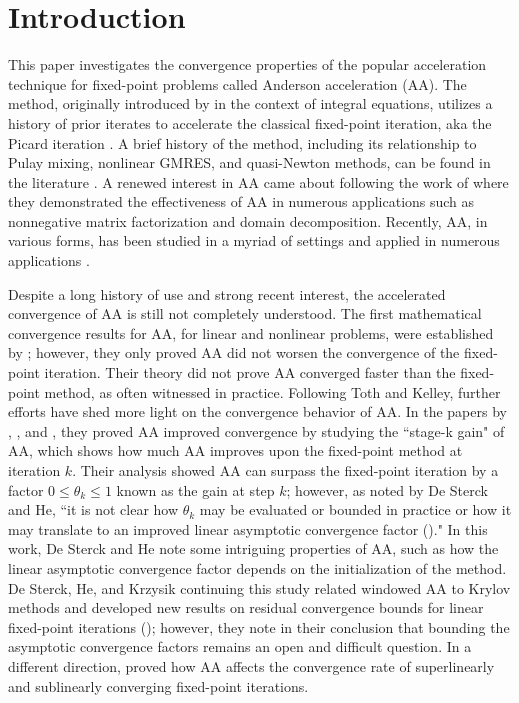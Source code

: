 \documentclass[11pt]{article}
\begin{document}
\section{Introduction}\label{sec:intro}
This paper investigates the convergence properties of the popular acceleration technique for fixed-point problems called Anderson acceleration (AA). The method, originally introduced by \cite{anderson1965} in the context of integral equations, utilizes a history of prior iterates to accelerate the classical fixed-point iteration, aka the Picard iteration \citep{picard1890memoire}. 
A brief history of the method, including its relationship to Pulay mixing, nonlinear GMRES, and quasi-Newton methods, can be found in the literature \citep{fang2009two,kelley2018numerical,potra2013characterization,pulay1980convergence}.
A renewed interest in AA came about following the work of \cite{walker2011anderson} where they demonstrated the effectiveness of AA in numerous applications such as nonnegative matrix factorization and domain decomposition. 
Recently, AA, in various forms, has been studied in a myriad of settings and applied in numerous applications \citep{geist2018anderson,shi2019regularized,sun2021damped,zhang2020globally,brezinski2022shanks,bian2021anderson,bian2022anderson}. 

Despite a long history of use and strong recent interest, the accelerated convergence of AA is still not completely understood. 
The first mathematical convergence results for AA, for linear and nonlinear problems, were established by \cite{Toth2015}; however, they only proved AA did not worsen the convergence of the fixed-point iteration. Their theory did
not prove AA converged faster than the fixed-point method, as often witnessed in practice. Following Toth and Kelley, further efforts have shed more light on the convergence behavior of AA. In the papers by \cite{Evans2020}, \cite{pollock2019anderson}, and \cite{pollock2021anderson}, they proved AA improved convergence by studying the ``stage-k gain" of AA, which shows how much AA improves upon the fixed-point method at iteration $k$. Their analysis showed AA can surpass the fixed-point iteration by a factor $0\leq \theta_k \leq 1$ known as the gain at step $k$; however, 
as noted by De Sterck and He, ``it is not clear how $\theta_k$ may be evaluated or bounded in practice or how it may translate to an improved linear asymptotic convergence factor (\citeyear{doi:10.1137/21M1449579})." 
In this work, De Sterck and He note some intriguing properties of AA, such as how the linear asymptotic convergence factor depends on the initialization of the method. 
De Sterck, He, and Krzysik continuing this study related windowed AA to Krylov methods and developed new results on residual convergence bounds for linear fixed-point iterations (\citeyear{de2024anderson}); however, they note in their conclusion that bounding the asymptotic convergence factors remains an open and difficult question. In a different direction, \cite{rebholz2023effect} proved how AA affects the convergence rate of superlinearly and sublinearly converging fixed-point iterations.  
\end{document}
